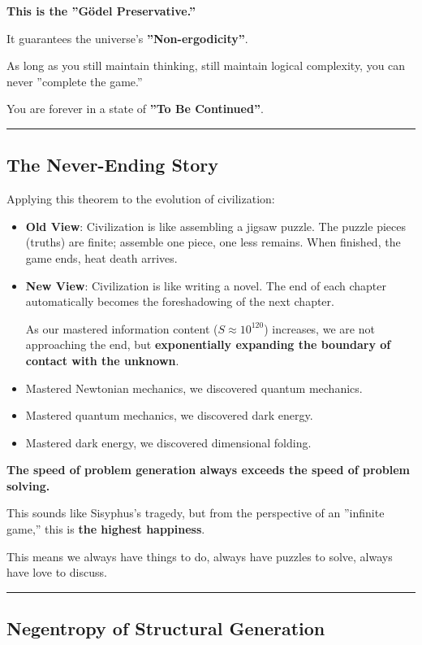 \textbf{This is the ''Gödel Preservative.''}

It guarantees the universe's \textbf{''Non-ergodicity''}.

As long as you still maintain thinking, still maintain logical complexity, you can never ''complete the game.''

You are forever in a state of \textbf{''To Be Continued''}.

\hrule

\subsection{The Never-Ending Story}

Applying this theorem to the evolution of civilization:

\begin{itemize}
\item \textbf{Old View}: Civilization is like assembling a jigsaw puzzle. The puzzle pieces (truths) are finite; assemble one piece, one less remains. When finished, the game ends, heat death arrives.

\item \textbf{New View}: Civilization is like writing a novel. The end of each chapter automatically becomes the foreshadowing of the next chapter.

As our mastered information content ($S \approx 10^{120}$) increases, we are not approaching the end, but \textbf{exponentially expanding the boundary of contact with the unknown}.

\item Mastered Newtonian mechanics, we discovered quantum mechanics.

\item Mastered quantum mechanics, we discovered dark energy.

\item Mastered dark energy, we discovered dimensional folding.
\end{itemize}

\textbf{The speed of problem generation always exceeds the speed of problem solving.}

This sounds like Sisyphus's tragedy, but from the perspective of an ''infinite game,'' this is \textbf{the highest happiness}.

This means we always have things to do, always have puzzles to solve, always have love to discuss.

\hrule

\subsection{Negentropy of Structural Generation}

